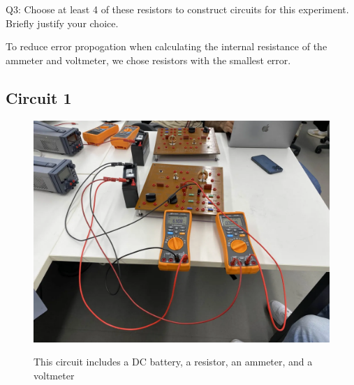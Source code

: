 \documentclass[12pt]{article}
\begin{document}
Q3: Choose at least 4 of these resistors to construct circuits for this experiment. Briefly justify your choice.

To reduce error propogation when calculating the internal resistance of the ammeter and voltmeter, we chose resistors with the smallest error.

\subsection*{Circuit 1}

\begin{figure}[H]
    \begin{centering}
    \includegraphics[width=0.5 \textwidth]{img/circuit_1.png}
    \label{fig:c1}
    \caption{This circuit includes a DC battery, a resistor, an ammeter, and a voltmeter}
    \end{centering}
\end{figure}
\end{document}

